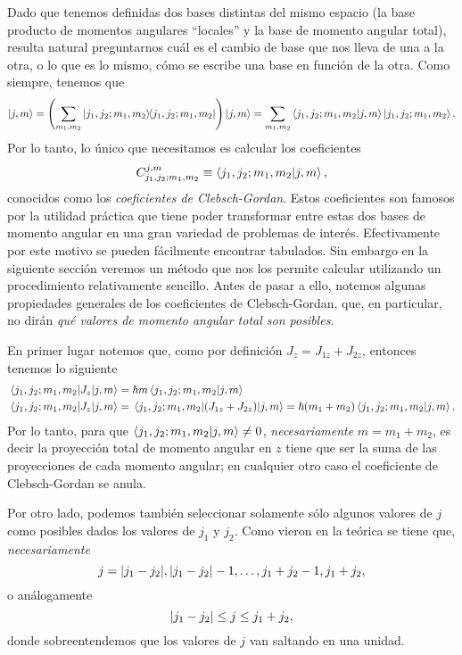 \documentclass[10pt, a4paper]{article}
\numberwithin{equation}{subsection}
\begin{document}
\bigbreak

Dado que tenemos definidas dos bases distintas del mismo espacio (la base
producto de momentos angulares ``locales'' y la base de momento angular total),
resulta natural preguntarnos cuál es el cambio de base que nos lleva de una a
la otra, o lo que es lo mismo, cómo se escribe una base en función de la otra.
Como siempre, tenemos que
\begin{equation}
  \ket{j,m} = \left(\sum_{m_1,m_2}\projector{j_1,j_2;m_1,m_2}\right)\ket{j,m}
    = \sum_{m_1,m_2} \braket{j_1,j_2;m_1,m_2}{j,m} \ket{j_1,j_2;m_1,m_2}.
\end{equation}
Por lo tanto, lo único que necesitamos es calcular los coeficientes
\begin{equation}
  C_{j_1,j_2;m_1,m_2}^{j,m} \equiv \braket{j_1,j_2;m_1,m_2}{j,m},
\end{equation}
conocidos como los \emph{coeficientes de Clebsch-Gordan}. Estos coeficientes
son famosos por la utilidad práctica que tiene poder transformar entre estas
dos bases de momento angular en una gran variedad de problemas de interés.
Efectivamente por este motivo se pueden fácilmente encontrar tabulados. Sin
embargo en la siguiente sección veremos un método que nos los permite calcular
utilizando un procedimiento relativamente sencillo. Antes de pasar a ello,
notemos algunas propiedades generales de los coeficientes de Clebsch-Gordan,
que, en particular, no dirán \emph{qué valores de momento angular total son
posibles}.

\bigbreak

En primer lugar notemos que, como por definición $J_z = J_{1z} + J_{2z}$,
entonces tenemos lo siguiente
\begin{align}
  \matrixel{j_1,j_2;m_1,m_2}{J_z}{j,m} &= \hbar m\braket{j_1,j_2;m_1,m_2}{j,m}
  \\
  \matrixel{j_1,j_2;m_1,m_2}{J_z}{j,m} &= 
  \matrixel{j_1,j_2;m_1,m_2}{\left(J_{1z} + J_{2z}\right)}{j,m} =
  \hbar(m_1+m_2)\braket{j_1,j_2;m_1,m_2}{j,m}.
\end{align}
Por lo tanto, para que $\braket{j_1,j_2;m_1,m_2}{j,m} \neq 0$,
\emph{necesariamente} $m = m_1 + m_2$, es decir la proyección total de momento
angular en $z$ tiene que ser la suma de las proyecciones de cada momento
angular; en cualquier otro caso el coeficiente de Clebsch-Gordan se anula.

Por otro lado, podemos también seleccionar solamente sólo algunos valores de
$j$ como posibles dados los valores de $j_1$ y $j_2$. Como vieron en la teórica
se tiene que, \emph{necesariamente}
\begin{equation}
  j = \abs{j_1 - j_2}, \abs{j_1 - j_2} - 1, \ldots, j_1 + j_2 - 1, j_1 + j_2,
\end{equation}
o análogamente
\begin{equation}
  \abs{j_1 - j_2} \leq j \leq j_1 + j_2,
\end{equation}
donde sobreentendemos que los valores de $j$ van saltando en una unidad.
\end{document}
